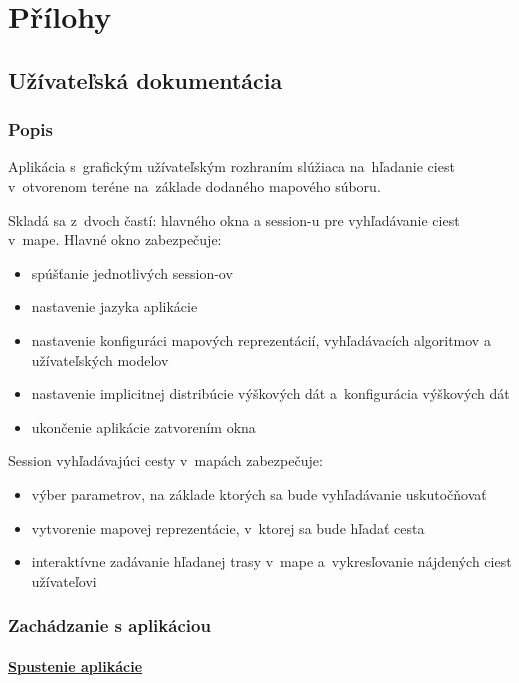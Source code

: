 \documentclass[12pt,a4paper]{report}
\begin{document}
\chapter{Přílohy}

\section{Užívateľská dokumentácia}\label{uzivatelska_dokumentacia}

\subsection{Popis}

Aplikácia s~grafickým užívateľským rozhraním slúžiaca na~hľadanie ciest v~otvorenom teréne na~základe dodaného mapového súboru.

Skladá sa z~dvoch častí: hlavného okna a session-u pre vyhľadávanie ciest v~mape. Hlavné okno zabezpečuje:
\begin{itemize}
    \item spúšťanie jednotlivých session-ov
    \item nastavenie jazyka aplikácie
    \item nastavenie konfiguráci mapových reprezentácií, vyhľadávacích algoritmov a užívateľských modelov
    \item nastavenie implicitnej distribúcie výškových dát a~konfigurácia výškových dát
    \item ukončenie aplikácie zatvorením okna
\end{itemize}
Session vyhľadávajúci cesty v~mapách zabezpečuje:
\begin{itemize}
    \item výber parametrov, na základe ktorých sa bude vyhľadávanie uskutočňovať
    \item vytvorenie mapovej reprezentácie, v~ktorej sa bude hľadať cesta
    \item interaktívne zadávanie hľadanej trasy v~mape a~vykresľovanie nájdených ciest užívateľovi
\end{itemize}

\subsection{Zachádzanie s aplikáciou}

\subsubsection{\underline{Spustenie aplikácie}}
\end{document}
